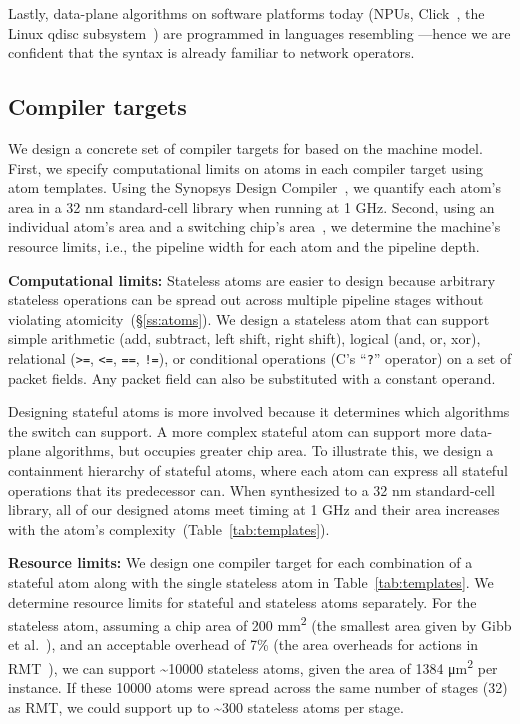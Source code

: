 Lastly, data-plane algorithms on software platforms today (NPUs,
Click~\cite{click}, the Linux qdisc subsystem~\cite{qdisc})  are programmed in languages
resembling \pktlanguage---hence we are confident that the \pktlanguage
syntax is already familiar to network operators.

\subsection{Compiler targets}
\label{ss:targets}

We design a concrete set of compiler targets for \pktlanguage based on the
\absmachine machine model. First, we specify computational limits on atoms in
each compiler target using atom templates. Using the Synopsys Design
Compiler~\cite{synopsys_dc}, we quantify each atom's area in a 32 nm
standard-cell library when running at 1 GHz.  Second, using an individual
atom's area and a switching chip's area~\cite{gibb_parsing}, we determine the
machine's resource limits, i.e., the pipeline width for each atom and the
pipeline depth.

\textbf{Computational limits:}
Stateless atoms are easier to design because arbitrary stateless operations can
be spread out across multiple pipeline stages without violating
atomicity~(\S\ref{ss:atoms}). We design a stateless atom that can support
simple arithmetic (add, subtract, left shift, right shift), logical (and, or,
xor), relational ({\tt >=}, {\tt <=}, {\tt ==}, {\tt !=}), or conditional operations (C's ``{\tt ?}''
operator) on a set of packet fields. Any packet field can also be substituted
with a constant operand.

Designing stateful atoms is more involved because it determines which
algorithms the switch can support. A more complex stateful atom can support
more data-plane algorithms, but occupies greater chip area. To illustrate this,
we design a containment hierarchy of stateful atoms, where each atom can
express all stateful operations that its predecessor can. When synthesized to a
32 nm standard-cell library, all of our designed atoms meet timing at 1 GHz and their area
increases with the atom's complexity~(Table~\ref{tab:templates}).

\textbf{Resource limits:}
We design one compiler target for each combination of a stateful atom along
with the single stateless atom in Table~\ref{tab:templates}.  We determine
resource limits for stateful and stateless atoms separately.  For the stateless
atom, assuming a chip area of 200 \si{\milli\metre\squared} (the smallest area given by Gibb et
al.~\cite{gibb_parsing}), and an acceptable overhead of 7\% (the area overheads
for actions in RMT~\cite{rmt}), we can support \textasciitilde10000 stateless atoms, given
the area of 1384 \si{\micro\metre\squared} per instance.  If these 10000 atoms were
spread across the same number of stages (32) as RMT, we could support up to
\textasciitilde300 stateless atoms per stage.

